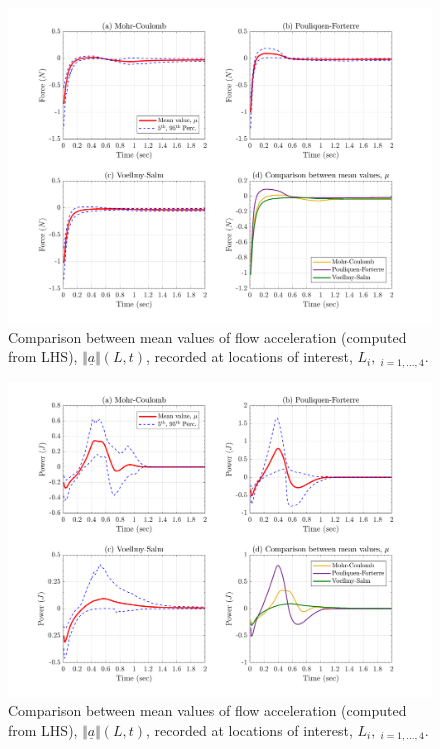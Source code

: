 \documentclass{article}
\begin{document}
\begin{itemize}
\begin{figure}[H]
        \centering
        \includegraphics[width=1\textwidth]{InclinedPlane/Forces_Powers/LHS2/FLHS2y.png}
        \caption{Comparison between mean values of flow acceleration (computed from LHS), $\Vert \underline{a} \Vert(L,t)$, recorded at locations of interest, $L_i, \ _{i=1,...,4}$.}
        \label{fig:Ramp-LHS2-Fy-spatial}
\end{figure}

\begin{figure}[H]
        \centering
        \includegraphics[width=1\textwidth]{InclinedPlane/Forces_Powers/LHS2/PLHS2.png}
        \caption{Comparison between mean values of flow acceleration (computed from LHS), $\Vert \underline{a} \Vert(L,t)$, recorded at locations of interest, $L_i, \ _{i=1,...,4}$.}
        \label{fig:Ramp-LHS2-Power-spatial}
\end{figure}


\end{itemize}
\end{document}
